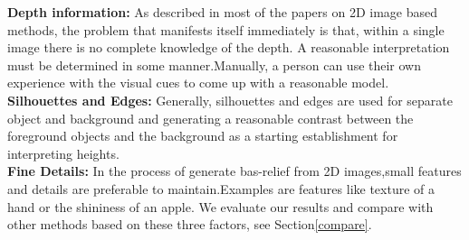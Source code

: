 \textbf{Depth information:} As described in most of the papers on 2D image based methods, the problem that manifests itself immediately is that, within a single image there is no complete knowledge of the depth. A reasonable interpretation must be determined in some
manner.Manually, a person can use their own experience with the visual cues to come up with a reasonable model. \\ 
\textbf{Silhouettes and Edges:} Generally, silhouettes and edges are used for separate object and background and generating a reasonable contrast between the foreground objects and the background as a starting establishment for interpreting heights. \\
\textbf{Fine Details:} In the process of generate bas-relief from 2D images,small features and details are preferable to maintain.Examples are features like texture of a hand or the shininess of an apple.  
We evaluate our results and compare with other methods based on these three factors, see Section\ref{compare}.

